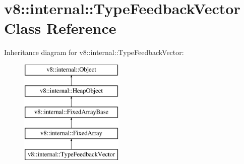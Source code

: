 \hypertarget{classv8_1_1internal_1_1_type_feedback_vector}{}\section{v8\+:\+:internal\+:\+:Type\+Feedback\+Vector Class Reference}
\label{classv8_1_1internal_1_1_type_feedback_vector}
Inheritance diagram for v8\+:\+:internal\+:\+:Type\+Feedback\+Vector\+:\begin{figure}[H]
\begin{center}
\leavevmode
\includegraphics[height=5.000000cm]{classv8_1_1internal_1_1_type_feedback_vector}
\end{center}
\end{figure}
